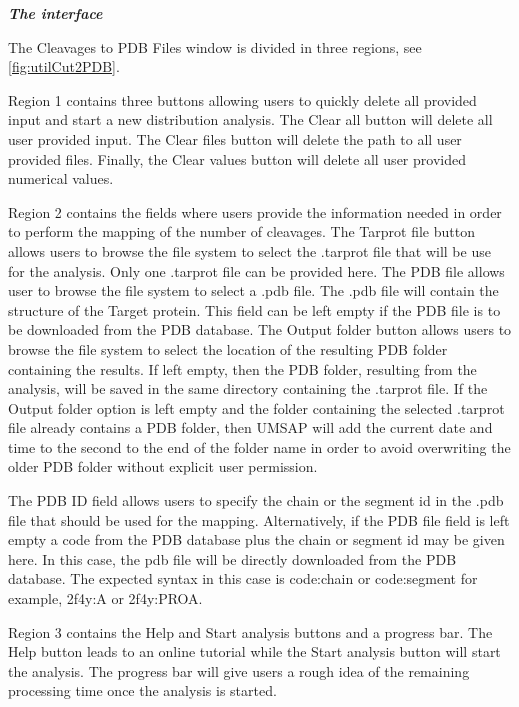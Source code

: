 \textit{\textbf{The interface}}

The Cleavages to PDB Files window is divided in three regions, see \autoref{fig:utilCut2PDB}.

Region \num{1} contains three buttons allowing users to quickly delete all provided input and start a new distribution analysis. The Clear all button will delete all user provided input. The Clear files button will delete the path to all user provided files. Finally, the Clear values button will delete all user provided numerical values.

Region \num{2} contains the fields where users provide the information needed in order to perform the mapping of the number of cleavages. The Tarprot file button allows users to browse the file system to select the .tarprot file that will be use for the analysis. Only one .tarprot file can be provided here. The PDB file allows user to browse the file system to select a .pdb file. The .pdb file will contain the structure of the Target protein. This field can be left empty if the PDB file is to be downloaded from the PDB database. The Output folder button allows users to browse the file system to select the location of the resulting PDB folder containing the results. If left empty, then the PDB folder, resulting from the analysis, will be saved in the same directory containing the .tarprot file. If the Output folder option is left empty and the folder containing the selected .tarprot file already contains a PDB folder, then UMSAP will add the current date and time to the second to the end of the folder name in order to avoid overwriting the older PDB folder without explicit user permission.

The PDB ID field allows users to specify the chain or the segment id in the .pdb file that should be used for the mapping. Alternatively, if the PDB file field is left empty a code from the PDB database plus the chain or segment id may be given here. In this case, the pdb file will be directly downloaded from the PDB database. The expected syntax in this case is code:chain or code:segment for example, 2f4y:A or 2f4y:PROA.  

Region \num{3} contains the Help and Start analysis buttons and a progress bar. The Help button leads to an online tutorial while the Start analysis button will start the analysis. The progress bar will give users a rough idea of the remaining processing time once the analysis is started.

